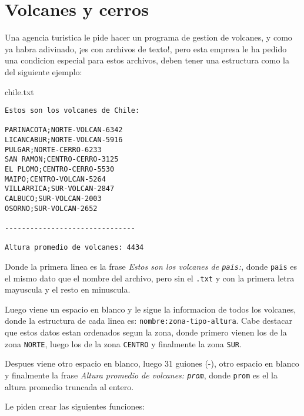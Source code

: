 \section{Volcanes y cerros}

Una agencia turistica le pide hacer un programa de gestion de volcanes, y como ya habra adivinado, ¡es con archivos de texto!, pero esta empresa le ha pedido una condicion especial para estos archivos, deben tener una estructura como la del siguiente ejemplo:

\begin{center}
	chile.txt
	\begin{lstlisting}[style=consola]
Estos son los volcanes de Chile:

PARINACOTA;NORTE-VOLCAN-6342
LICANCABUR;NORTE-VOLCAN-5916
PULGAR;NORTE-CERRO-6233
SAN RAMON;CENTRO-CERRO-3125
EL PLOMO;CENTRO-CERRO-5530
MAIPO;CENTRO-VOLCAN-5264
VILLARRICA;SUR-VOLCAN-2847
CALBUCO;SUR-VOLCAN-2003
OSORNO;SUR-VOLCAN-2652

-------------------------------

Altura promedio de volcanes: 4434
	\end{lstlisting}
\end{center}

Donde la primera linea es la frase \textit{Estos son los volcanes de \texttt{pais}:}, donde \texttt{pais} es el mismo dato que el nombre del archivo, pero sin el \texttt{.txt} y con la primera letra mayuscula y el resto en minuscula. 

Luego viene un espacio en blanco y le sigue la informacion de todos los volcanes, donde la estructura de cada linea es: \texttt{nombre:zona-tipo-altura}. Cabe destacar que estos datos estan ordenados segun la zona, donde primero vienen los de la zona \texttt{NORTE}, luego los de la zona \texttt{CENTRO} y finalmente la zona \texttt{SUR}.

Despues viene otro espacio en blanco, luego 31 guiones (-), otro espacio en blanco y finalmente la frase \textit{Altura promedio de volcanes: \texttt{prom}}, donde \texttt{prom} es el la altura promedio truncada al entero.

Le piden crear las siguientes funciones:

